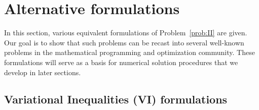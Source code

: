 {%










\section{Alternative formulations}
\label{sec:formulation}
In this section, various equivalent formulations of Problem~\ref{prob:II} are {given.
Our goal is to show that} such problems can be recast into several well-known problems in the mathematical programming and optimization community.
These formulations will serve as a basis for numerical solution procedures that we develop in later sections.

\subsection{Variational Inequalities (VI) formulations}

}
